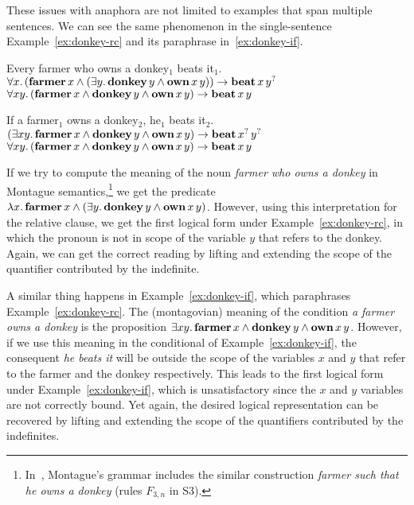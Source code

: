 These issues with anaphora are not limited to examples that span multiple
sentences. We can see the same phenomenon in the single-sentence
Example~\ref{ex:donkey-rc} and its paraphrase in~\ref{ex:donkey-if}.

\begin{exe}
  \ex Every farmer who owns a donkey$_1$ beats it$_1$. \label{ex:donkey-rc} \\
  $\forall x.\, (\textbf{farmer}\,x \land (\exists y.\,
  \textbf{donkey}\,y \land \textbf{own}\,x\,y)) \to
  \textbf{beat}\,x\,y^?$ \\
  $\forall x y.\, (\textbf{farmer}\,x \land \textbf{donkey}\,y \land
  \textbf{own}\,x\,y) \to \textbf{beat}\,x\,y$

  \ex If a farmer$_1$ owns a donkey$_2$, he$_1$ beats it$_2$. \label{ex:donkey-if} \\
  $(\exists x y.\, \textbf{farmer}\,x \land \textbf{donkey}\,y \land \textbf{own}\,x\,y) \to \textbf{beat}\,x^?\,y^?$ \\
  $\forall x y.\, (\textbf{farmer}\,x \land \textbf{donkey}\,y \land
  \textbf{own}\,x\,y) \to \textbf{beat}\,x\,y$
\end{exe}

If we try to compute the meaning of the noun \emph{farmer who owns a
  donkey} in Montague semantics,\footnote{In~\cite{montague1973proper},
  Montague's grammar includes the similar construction \emph{farmer such
    that he owns a donkey} (rules $F_{3,n}$ in S3).} we get the predicate
$\lambda x.\, \textbf{farmer}\,x \land (\exists y.\, \textbf{donkey}\,y
  \land \textbf{own}\,x\,y)$. However, using this interpretation for
the relative clause, we get the first logical form under
Example~\ref{ex:donkey-rc}, in which the pronoun is not in scope of the
variable $y$ that refers to the donkey. Again, we can get the correct
reading by lifting and extending the scope of the quantifier contributed by
the indefinite.

A similar thing happens in Example~\ref{ex:donkey-if}, which paraphrases
Example~\ref{ex:donkey-rc}. The (montagovian) meaning of the condition
\emph{a farmer owns a donkey} is the proposition
$\exists x y.\, \textbf{farmer}\,x \land \textbf{donkey}\,y \land
\textbf{own}\,x\,y$. However, if we use this meaning in the conditional
of Example~\ref{ex:donkey-if}, the consequent \emph{he beats it} will be
outside the scope of the variables $x$ and $y$ that refer to the farmer and
the donkey respectively. This leads to the first logical form under
Example~\ref{ex:donkey-if}, which is unsatisfactory since the $x$ and $y$
variables are not correctly bound. Yet again, the desired logical
representation can be recovered by lifting and extending the scope of the
quantifiers contributed by the indefinites.

